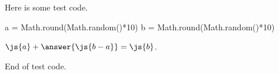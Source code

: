 \documentclass[nooutcomes]{ximera}
\begin{document}
Here is some test code. 

    \begin{javascript}
      a = Math.round(Math.random()*10)
      b = Math.round(Math.random()*10)
    \end{javascript}
    
    \begin{problem}
      $\js{a} + \answer{\js{b-a}} = \js{b}$.
    \end{problem}
End of test code. 
\end{document}
